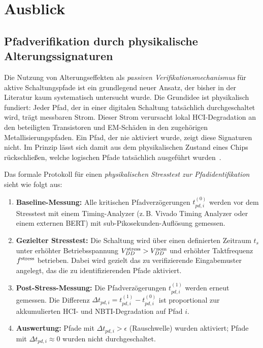﻿\documentclass[a4paper,12pt]{article}
\theoremstyle{definition}
\begin{document}
\section{Ausblick}
\label{sec:ausblick}

\subsection{Pfadverifikation durch physikalische Alterungssignaturen}
\label{sub:pfad}

Die Nutzung von Alterungseffekten als \emph{passiven Verifikationsmechanismus}
für aktive Schaltungspfade ist ein grundlegend neuer Ansatz, der bisher in der
Literatur kaum systematisch untersucht wurde. Die Grundidee ist physikalisch
fundiert: Jeder Pfad, der in einer digitalen Schaltung tatsächlich durchgeschaltet
wird, trägt messbaren Strom. Dieser Strom verursacht lokal HCI-Degradation
an den beteiligten Transistoren und EM-Schäden in den zugehörigen Metallisierungspfaden.
Ein Pfad, der nie aktiviert wurde, zeigt diese Signaturen nicht. Im Prinzip lässt
sich damit aus dem physikalischen Zustand eines Chips rückschließen, welche logischen
Pfade tatsächlich ausgeführt wurden~\cite{hu1985,alam2005}.

Das formale Protokoll für einen \emph{physikalischen Stresstest zur Pfadidentifikation}
sieht wie folgt aus:
\begin{enumerate}
	\item \textbf{Baseline-Messung:} Alle kritischen Pfadverzögerungen $t_{pd,i}^{(0)}$
	      werden vor dem Stresstest mit einem Timing-Analyzer (z.\,B. Vivado Timing
	      Analyzer oder einem externen BERT) mit sub-Pikosekunden-Auflösung gemessen.
	\item \textbf{Gezielter Stresstest:} Die Schaltung wird über einen definierten
	      Zeitraum $t_s$ unter erhöhter Betriebsspannung $V_{DD}^{\rm stress} > V_{DD}^{\rm nom}$
	      und erhöhter Taktfrequenz $f^{\rm stress}$ betrieben. Dabei wird gezielt
	      das zu verifizierende Eingabemuster angelegt, das die zu identifizierenden
	      Pfade aktiviert.
	\item \textbf{Post-Stress-Messung:} Die Pfadverzögerungen $t_{pd,i}^{(1)}$ werden
	      erneut gemessen. Die Differenz $\Delta t_{pd,i} = t_{pd,i}^{(1)} - t_{pd,i}^{(0)}$
	      ist proportional zur akkumulierten HCI- und NBTI-Degradation auf Pfad $i$.
	\item \textbf{Auswertung:} Pfade mit $\Delta t_{pd,i} > \epsilon$ (Rauschwelle)
	      wurden aktiviert; Pfade mit $\Delta t_{pd,i} \approx 0$ wurden nicht durchgeschaltet.
\end{enumerate}
\end{document}
